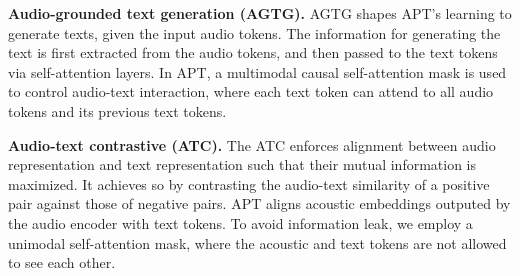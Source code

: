 \documentclass{article} %
\begin{document}
\textbf{Audio-grounded text generation (AGTG).} AGTG shapes APT's learning to generate texts, given the input audio tokens. The information for generating the text is first extracted from the audio tokens, and then passed to the text tokens via self-attention layers. In APT, a multimodal causal self-attention mask is used to control audio-text interaction, where each text token can attend to all audio tokens and its previous text tokens.

\textbf{Audio-text contrastive (ATC).} The ATC enforces alignment between audio representation and text representation such that their mutual information is maximized. It achieves so by contrasting the audio-text similarity of a positive pair against those of negative pairs. APT aligns acoustic embeddings outputed by the audio encoder with text tokens. To avoid information leak, we employ a unimodal self-attention mask, where the acoustic and text tokens are not allowed to see each other.
\end{document}
